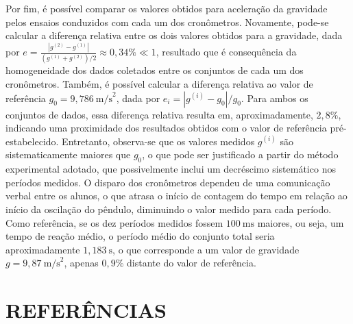 \documentclass[12pt, a4paper, brazil]{article}
\begin{document}
Por fim, é possível comparar os valores obtidos para aceleração da gravidade pelos ensaios conduzidos com cada um dos cronômetros. Novamente, pode-se calcular a diferença relativa entre os dois valores obtidos para a gravidade, dada por $e =\frac{|g^{(2)}-g^{(1)}|}{(g^{(1)}+g^{(2)})/2}\approx 0,34\%\ll 1$, resultado que é consequência da homogeneidade dos dados coletados entre os conjuntos de cada um dos cronômetros. Também, é possível calcular a diferença relativa ao valor de referência $g_0 = 9,786\ \text{m/s}^2$, dada por $e_i = |g^{(i)}-g_0|/g_0$. Para ambos os conjuntos de dados, essa diferença relativa resulta em, aproximadamente, $2,8\%$, indicando uma proximidade dos resultados obtidos com o valor de referência pré-estabelecido. Entretanto, observa-se que os valores medidos $g^{(i)}$ são sistematicamente maiores que $g_0$, o que pode ser justificado a partir do método experimental adotado, que possivelmente inclui um decréscimo sistemático nos períodos medidos. O disparo dos cronômetros dependeu de uma comunicação verbal entre os alunos, o que atrasa o início de contagem do tempo em relação ao início da oscilação do pêndulo, diminuindo o valor medido para cada período. Como referência, se os dez períodos medidos fossem $100\ \text{ms}$ maiores, ou seja, um tempo de reação médio, o período médio do conjunto total seria aproximadamente $1,183\ \text{s}$, o que corresponde a um valor de gravidade $g=9,87\ \text{m/s}^2$, apenas $0,9\%$ distante do valor de referência.


\newpage

\clearpage
\renewcommand{\refname}{}
\section{REFERÊNCIAS}
\vspace{-1.5\baselineskip}

\end{document}
